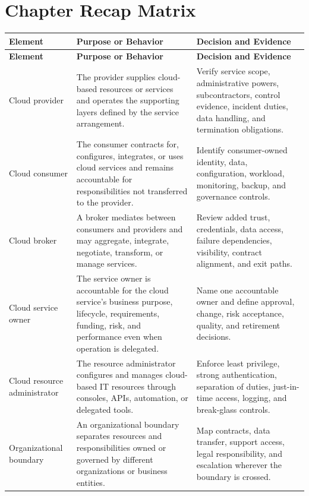 \documentclass[11pt]{article}
\begin{document}
\section{Chapter Recap Matrix}
\begingroup\small\setlength{\tabcolsep}{4pt}
\begin{longtable}{@{}>{\RaggedRight\arraybackslash}p{}>{\RaggedRight\arraybackslash}p{}>{\RaggedRight\arraybackslash}p{}@{}}
\toprule\rowcolor{Navy}\color{white}\textbf{Element} & \color{white}\textbf{Purpose or Behavior} & \color{white}\textbf{Decision and Evidence}\\\midrule\endfirsthead
\toprule\rowcolor{Navy}\color{white}\textbf{Element} & \color{white}\textbf{Purpose or Behavior} & \color{white}\textbf{Decision and Evidence}\\\midrule\endhead
Cloud provider & The provider supplies cloud-based resources or services and operates the supporting layers defined by the service arrangement. & Verify service scope, administrative powers, subcontractors, control evidence, incident duties, data handling, and termination obligations. \\\midrule
Cloud consumer & The consumer contracts for, configures, integrates, or uses cloud services and remains accountable for responsibilities not transferred to the provider. & Identify consumer-owned identity, data, configuration, workload, monitoring, backup, and governance controls. \\\midrule
Cloud broker & A broker mediates between consumers and providers and may aggregate, integrate, negotiate, transform, or manage services. & Review added trust, credentials, data access, failure dependencies, visibility, contract alignment, and exit paths. \\\midrule
Cloud service owner & The service owner is accountable for the cloud service's business purpose, lifecycle, requirements, funding, risk, and performance even when operation is delegated. & Name one accountable owner and define approval, change, risk acceptance, quality, and retirement decisions. \\\midrule
Cloud resource administrator & The resource administrator configures and manages cloud-based IT resources through consoles, APIs, automation, or delegated tools. & Enforce least privilege, strong authentication, separation of duties, just-in-time access, logging, and break-glass controls. \\\midrule
Organizational boundary & An organizational boundary separates resources and responsibilities owned or governed by different organizations or business entities. & Map contracts, data transfer, support access, legal responsibility, and escalation wherever the boundary is crossed. \\\midrule

\end{longtable}
\end{document}
